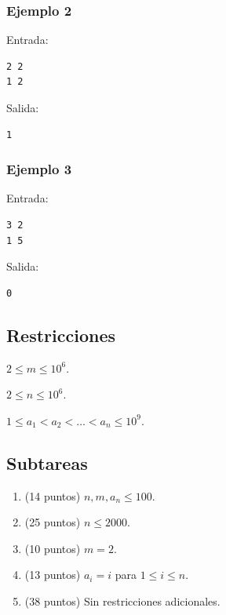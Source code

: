 \documentclass[10.5pt]{article}
\begin{document}
\subsubsection*{Ejemplo 2}
Entrada:
\begin{verbatim}
2 2
1 2
\end{verbatim}
Salida:
\begin{verbatim}
1
\end{verbatim}

\subsubsection*{Ejemplo 3}
Entrada:
\begin{verbatim}
3 2
1 5
\end{verbatim}
Salida:
\begin{verbatim}
0
\end{verbatim}

\subsection*{Restricciones}
$2 \leq m \leq 10^6$.

$2 \leq n \leq 10^6$.

$1 \leq a_1 < a_2 < \ldots < a_n \leq 10^9$.
\subsection*{Subtareas}

\begin{enumerate}
    \item (14 puntos) $n, m, a_n \leq 100$.
    \item (25 puntos) $n \leq 2000$.
    \item (10 puntos) $m = 2$.
    \item (13 puntos) $a_i = i$ para $1 \leq i \leq n$.
    \item (38 puntos) Sin restricciones adicionales.
\end{enumerate}
\end{document}
